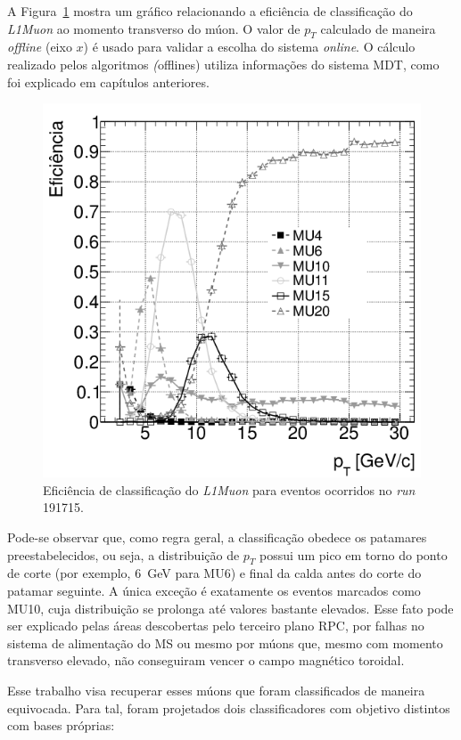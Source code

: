 A Figura~\ref{fig:muonrates} mostra um gráfico relacionando a eficiência de
classificação do \emph{L1Muon} ao momento transverso do múon. O valor de $p_T$
calculado de maneira \emph{offline} (eixo $x$) é usado para validar a escolha
do sistema \emph{online}. O cálculo realizado pelos algoritmos \emph(offlines)
utiliza informações do sistema MDT, como foi explicado em capítulos anteriores.

\begin{figure}[ht!]
    \centering
    \includegraphics[width=12cm]{images/ppm_rpc_turnon_mu10.png}
    \caption{Eficiência de classificação do \emph{L1Muon} para eventos
    ocorridos no \emph{run} 191715.}
    \label{fig:muonrates}
\end{figure}

Pode-se observar que, como regra geral, a classificação obedece os patamares
preestabelecidos, ou seja, a distribuição de $p_T$ possui um pico em torno do
ponto de corte (por exemplo, 6~GeV para MU6) e final da calda antes do corte do
patamar seguinte. A única exceção é exatamente os eventos marcados como MU10,
cuja distribuição se prolonga até valores bastante elevados. Esse fato pode ser
explicado pelas áreas descobertas pelo terceiro plano RPC, por falhas no sistema
de alimentação do MS ou mesmo por múons que, mesmo com momento transverso
elevado, não conseguiram vencer o campo magnético toroidal.

Esse trabalho visa recuperar esses múons que foram classificados de maneira
equivocada. Para tal, foram projetados dois classificadores com objetivo
distintos com bases próprias:


